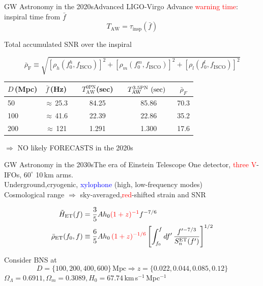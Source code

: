 \documentclass[xcolor=dvipsnames,handout,t]{beamer}
\newcommand{\red}[1]{\textcolor{red}{#1}}
\newcommand{\bl}[1]{\textcolor{blue}{#1}}
\newcommand{\f}{\frac}
\newcommand\T{\rule{0pt}{2.6ex}}       %
\newcommand\B{\rule[-1.2ex]{0pt}{0pt}} %
\begin{document}
\begin{frame}{GW Astronomy in the 2020s}{Advanced LIGO-Virgo}
  Advance \red{warning time}: inspiral time from $\bar{f}$
  \[
    T_\text{AW} = \tau_\text{insp}(\bar{f})
  \]
  {
    Total accumulated SNR over the inspiral
    \begin{footnotesize}
      \[
      \bar{\rho}_\text{F}\equiv\sqrt{\left[{\rho}_h(f_0^h,{f}_\text{ISCO})\right]^2+\left[{\rho}_m(f_0^m,{f}_\text{ISCO})\right]^2+\left[{\rho}_l(f_0^l,{f}_\text{ISCO})\right]^2}
      \]
      \begin{table}[h]
	\centering
	\begin{tabular}{lcccccc}
	  \hline\hline
	  $D\,$(Mpc) & $\bar{f}\,$(Hz) &{}& $T^\text{0PN}_\text{AW}$(sec) &\hspace{1mm} & $T^\text{3.5PN}_\text{AW}\text{ (sec)}\hspace{2mm}$& $\bar{\rho}_F$\T \B \\
	  \hline
	  50 & $\approx\,$25.3 & & 84.25 & & 85.86 & 70.3 \\
	  100 & $\approx\,$41.6 & & 22.39 & & 22.86 & 35.2 \\
	  200 & $\approx\,$121 & & 1.291 &\quad & 1.300 & 17.6 \\
	  \hline\hline
	\end{tabular}
      \end{table}
    \end{footnotesize}
  }
%
$\Longrightarrow$ NO likely FORECASTS  in the 2020s

\end{frame}


\begin{frame}{GW Astronomy in the 2030s}{The era of Einstein Telescope}
 One detector, \red{three V}-IFOs, $60^\circ$ 10\,km arms.\\
 Underground,cryogenic, \bl{xylophone} (high, low-frequency modes)\\
 \vspace{1mm}
 Cosmological range $\Rightarrow$ sky-averaged,\red{red}-shifted strain and SNR
 \begin{footnotesize}
 \begin{align*} 
  \tilde{H}_\text{ET}(f) &= \f{3}{5}A h_0 \red{(1+z)^{-1}} f^{-7/6}\\
  \bar\rho_{\text{ET}}(f_0,f)&\equiv \f{6}{5}A h_0\, \red{(1+z)^{-1/6}}\left[\int_{f_0}^{f} d f'\, \f{f'^{-7/3}}{S^\text{ET}_n(f')}\right]^{1/2}
 \end{align*} 
 \end{footnotesize}
Consider BNS at \\
$$ D=\{100,200, 400, 600\}\,\text{Mpc} \Longrightarrow z=\{0.022, 0.044, 0.085, 0.12\}$$
$\Omega_\Lambda = 0.6911, \Omega_m = 0.3089, H_0 = 67.74\,$km\,s$^{-1}\,$Mpc$^{-1}$

\end{frame}
\end{document}
